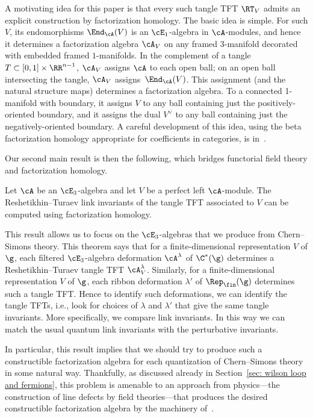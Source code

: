 \documentclass[10pt]{amsart}
\begin{document}
A motivating idea for this paper is that every such tangle TFT $\RT_V$ admits an explicit construction by factorization homology.
The basic idea is simple. 
For such $V$, its endomorphisms $\End_\cA(V)$ is an $\cE_1$-algebra in $\cA$-modules, and hence it determines a factorization algebra $\cA_V$ on any framed $3$-manifold decorated with embedded framed $1$-manifolds. 
In the complement of a tangle $T \subset [0,1] \times \RR^{n-1}$, 
$\cA_V$ assigns $\cA$ to each open ball;
on an open ball intersecting the tangle, $\cA_V$ assigns~$\End_\cA(V)$.
This assignment (and the natural structure maps) determines a factorization algebra.
To a connected 1-manifold with boundary, it assigns $V$ to any ball containing just the positively-oriented boundary,
and it assigns the dual $V^\vee$ to any ball containing just the negatively-oriented boundary.
A careful development of this idea, 
using the beta factorization homology appropriate for coefficients in categories, is in~\cite{AF.tangle.fact}.

Our second main result is then the following,
which bridges functorial field theory and factorization homology.

\begin{thm}
\label{second main theorem}
Let $\cA$ be an $\cE_3$-algebra and let $V$ be a perfect left $\cA$-module.
The Reshetikhin--Turaev link invariants of the tangle TFT associated to $V$ can be computed using factorization homology.
\end{thm}

This result allows us to focus on the $\cE_3$-algebras that we produce from Chern--Simons theory.
This theorem says that for a finite-dimensional representation $V$ of $\g$,
each filtered $\cE_3$-algebra deformation $\cA^\lambda$ of $\C^*(\g)$ determines
a Reshetikhin--Turaev tangle TFT $\cA^\lambda_V$.
Similarly, for a finite-dimensional representation $V$ of $\g$, 
each ribbon deformation $\lambda'$ of $\Rep_\fin(\g)$ determines such a tangle TFT.
Hence to identify such deformations, we can identify the tangle TFTs,
i.e., look for choices of $\lambda$ and $\lambda'$ that give the same tangle invariants.
More specifically, we compare link invariants.
In this way we can match the usual quantum link invariants with the perturbative invariants.

In particular, this result implies that we should try to produce such a constructible factorization algebra for each quantization of Chern--Simons theory in some natural way.
Thankfully, as discussed already in Section~\ref{sec: wilson loop and fermions}, this problem is amenable to an approach from physics---the construction of line defects by field theories---that produces the desired constructible factorization algebra by the machinery of~\cite{CG1,CG2}.
\end{document}
